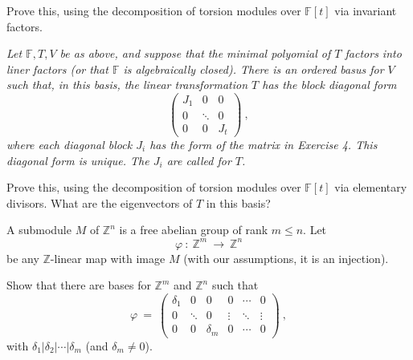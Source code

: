 \documentclass[12pt]{article}
\newcommand{\FF}{{\mathbb F}}
\newcommand{\ZZ}{{\mathbb Z}}
\def\demph#1{{\color{blue}{\sl #1}}}
\begin{document}
\noindent
{\color{brown}{\bf Exercise 6:}} Prove this, using the decomposition of torsion modules over $\FF[t]$ via invariant factors.\newpage


\noindent
    {\color{brown}{\bf Theorem. (Jordan Canonical Form)} }
    {\sl Let $\FF,T,V$ be as above, and suppose that the minimal polyomial of $T$ factors into liner factors (or that $\FF$ is algebraically
      closed).
      There is an ordered basus for $V$ such that, in this basis, the linear transformation $T$ has the block diagonal form
\[
    \left(\begin{matrix} J_1 &   0  & 0 \\
                          0  &\ddots& 0 \\
                          0  &   0  &J_t\end{matrix}\right )\ ,
\]
where each diagonal block $J_i$ has the form of the matrix in Exercise 4.
This diagonal form is unique.
    The $J_i$ are called \demph{Jordan blocks} for $T$.}

\noindent
    {\color{brown}{\bf Exercise 7:}} Prove this, using the decomposition of torsion modules over $\FF[t]$ via elementary divisors.
    What are the eigenvectors of $T$ in this basis?\medskip


A submodule $M$ of $\ZZ^n$ is a free abelian group of rank $m\leq n$.
Let
\[
\varphi\ \colon\ \ZZ^m\ \longrightarrow\ \ZZ^n
\]
be any $\ZZ$-linear map with image $M$ (with our assumptions, it is an injection).


\noindent
    {\color{brown}{\bf Exercise 8:}}  Show that there are bases for $\ZZ^m$ and $\ZZ^n$ such that
      \[
      \varphi\ =\ \left(\begin{matrix} \delta_1&   0  &    0   & 0&\dotsb& 0 \\
                                        0      &\ddots&    0   &\vdots&\ddots& \vdots\\
                                        0      &  0   &\delta_m&0& \dotsb& 0 \end{matrix}\right)\ ,
      \]
     with $\delta_1|\delta_2|\dotsb|\delta_m$ (and $\delta_m\neq 0$).\medskip
\end{document}
